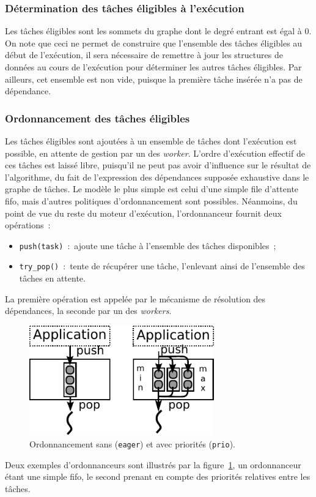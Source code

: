 \documentclass[11pt]{article}
\theoremstyle{plain} %
\theoremstyle{definition} %
\begin{document}
\subsubsection{Détermination des tâches éligibles à l'exécution}
\label{sec:determ-des-tach}
Les tâches éligibles sont les sommets du graphe dont le degré entrant est égal à 0.
On note que ceci ne permet de construire que l'ensemble des tâches éligibles au début de l'exécution, il sera nécessaire de remettre à jour les structures de données au cours de l'exécution pour déterminer les autres tâches éligibles.
Par ailleurs, cet ensemble est non vide, puisque la première tâche insérée n'a pas de dépendance.

\subsubsection{Ordonnancement des tâches éligibles}
\label{sec:ordonn-des-tach}
Les tâches éligibles sont ajoutées à un ensemble de tâches dont l'exécution est possible, en attente de gestion par un des \emph{worker}.
L'ordre d'exécution effectif de ces tâches est laissé libre, puisqu'il ne peut pas avoir d'influence sur le résultat de l'algorithme, du fait de l'expression des dépendances supposée exhaustive dans le graphe de tâches.
Le modèle le plus simple est celui d'une simple file d'attente \ac{fifo}, mais d'autres politiques d'ordonnancement sont possibles.
Néanmoins, du point de vue du reste du moteur d'exécution, l'ordonnanceur fournit deux opérations~:~
\begin{itemize}
\item \texttt{push(task)}~:~ajoute une tâche à l'ensemble des tâches disponibles~;
\item \texttt{try\_pop()}~:~tente de récupérer une tâche, l'enlevant ainsi de l'ensemble des tâches en attente.
\end{itemize}
La première opération est appelée par le mécanisme de résolution des dépendances, la seconde par un des \emph{workers}.

\begin{figure}
  \centering
  \includegraphics[width=8cm]{figures/eager-prio-starpu.pdf}
  \caption{Ordonnancement sans (\texttt{eager}) et avec priorités (\texttt{prio}).}
  \label{fig:eager-prio-starpu}
\end{figure}
Deux exemples d'ordonnanceurs sont illustrés par la figure~\ref{fig:eager-prio-starpu}, un ordonnanceur étant une simple \ac{fifo}, le second prenant en compte des priorités relatives entre les tâches.
\end{document}
